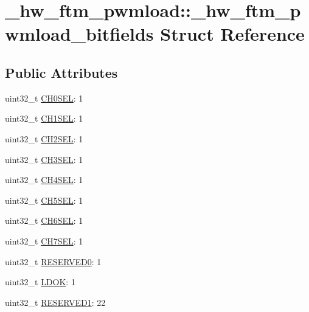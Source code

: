 \hypertarget{struct__hw__ftm__pwmload_1_1__hw__ftm__pwmload__bitfields}{}\section{\+\_\+hw\+\_\+ftm\+\_\+pwmload\+:\+:\+\_\+hw\+\_\+ftm\+\_\+pwmload\+\_\+bitfields Struct Reference}
\label{struct__hw__ftm__pwmload_1_1__hw__ftm__pwmload__bitfields}
\subsection*{Public Attributes}
\begin{DoxyCompactItemize}
\item 
uint32\+\_\+t \hyperlink{struct__hw__ftm__pwmload_1_1__hw__ftm__pwmload__bitfields_a5f27f640846fad8323b20e9c0bdccd1d}{C\+H0\+S\+EL}\+: 1
\item 
uint32\+\_\+t \hyperlink{struct__hw__ftm__pwmload_1_1__hw__ftm__pwmload__bitfields_a00d6fda2ea00c638d10dd9a7c53e5eb8}{C\+H1\+S\+EL}\+: 1
\item 
uint32\+\_\+t \hyperlink{struct__hw__ftm__pwmload_1_1__hw__ftm__pwmload__bitfields_a825bd98c6e40a88f0d377db142c996ad}{C\+H2\+S\+EL}\+: 1
\item 
uint32\+\_\+t \hyperlink{struct__hw__ftm__pwmload_1_1__hw__ftm__pwmload__bitfields_a35d059ba310111fad364b8a0ddfb0ffc}{C\+H3\+S\+EL}\+: 1
\item 
uint32\+\_\+t \hyperlink{struct__hw__ftm__pwmload_1_1__hw__ftm__pwmload__bitfields_ae3195f98c5ac64157b2247c593081df1}{C\+H4\+S\+EL}\+: 1
\item 
uint32\+\_\+t \hyperlink{struct__hw__ftm__pwmload_1_1__hw__ftm__pwmload__bitfields_a8c6416aa2fc5e173fedc67dbaecef004}{C\+H5\+S\+EL}\+: 1
\item 
uint32\+\_\+t \hyperlink{struct__hw__ftm__pwmload_1_1__hw__ftm__pwmload__bitfields_ac7c9130482743625e9792e9beaf70d48}{C\+H6\+S\+EL}\+: 1
\item 
uint32\+\_\+t \hyperlink{struct__hw__ftm__pwmload_1_1__hw__ftm__pwmload__bitfields_a7e425e57f6fc7411f5463d30c609df46}{C\+H7\+S\+EL}\+: 1
\item 
uint32\+\_\+t \hyperlink{struct__hw__ftm__pwmload_1_1__hw__ftm__pwmload__bitfields_ab28058e83a7216ff12414fef308c0da1}{R\+E\+S\+E\+R\+V\+E\+D0}\+: 1
\item 
uint32\+\_\+t \hyperlink{struct__hw__ftm__pwmload_1_1__hw__ftm__pwmload__bitfields_a13b04d6840087207cdf0e60ef3ca5700}{L\+D\+OK}\+: 1
\item 
uint32\+\_\+t \hyperlink{struct__hw__ftm__pwmload_1_1__hw__ftm__pwmload__bitfields_af413226bc6202ec273c9a66e6910367a}{R\+E\+S\+E\+R\+V\+E\+D1}\+: 22
\end{DoxyCompactItemize}


